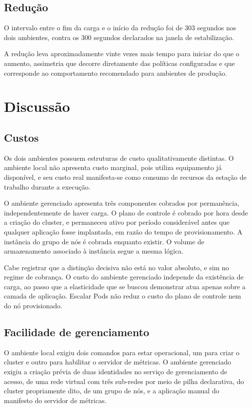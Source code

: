 \documentclass[12pt]{article}
\begin{document}
\subsection{Redução}

O intervalo entre o fim da carga e o início da redução foi de 303 segundos nos
dois ambientes, contra os 300 segundos declarados na janela de estabilização.

A redução leva aproximadamente
vinte vezes mais tempo para iniciar do que o aumento, assimetria que decorre
diretamente das políticas configuradas e que corresponde ao comportamento
recomendado para ambientes de produção.

\section{Discussão}

\subsection{Custos}

Os dois ambientes possuem estruturas de custo qualitativamente distintas. O
ambiente local não apresenta custo marginal, pois utiliza equipamento já
disponível, e seu custo real manifesta-se como consumo de recursos da estação de
trabalho durante a execução.

O ambiente gerenciado apresenta três componentes cobrados por permanência,
independentemente de haver carga. O plano de controle é cobrado por hora desde
a criação do cluster, e permaneceu ativo por período considerável antes que
qualquer aplicação fosse implantada, em razão do tempo de provisionamento. A
instância do grupo de nós é cobrada enquanto existir. O volume de armazenamento
associado à instância segue a mesma lógica.

Cabe registrar que a distinção decisiva não está no valor absoluto, e sim no
regime de cobrança. O custo do ambiente gerenciado independe da existência de
carga, ao passo que a elasticidade que se buscou demonstrar atua apenas sobre a
camada de aplicação. Escalar Pods não reduz o custo do plano de controle nem do
nó provisionado.

\subsection{Facilidade de gerenciamento}

O ambiente local exigiu dois comandos para estar operacional, um para criar o
cluster e outro para habilitar o servidor de métricas. O ambiente gerenciado
exigiu a criação prévia de duas identidades no serviço de gerenciamento de
acesso, de uma rede virtual com três sub-redes por meio de pilha declarativa, do
cluster propriamente dito, de um grupo de nós, e a aplicação manual do manifesto
do servidor de métricas.
\end{document}
